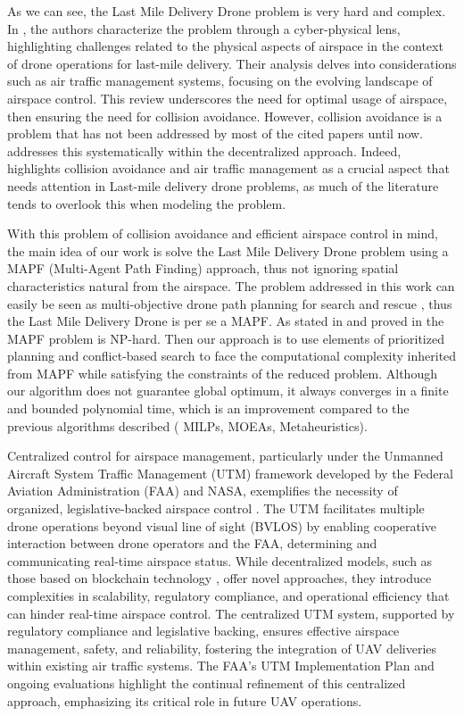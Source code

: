 As we can see, the Last Mile Delivery Drone problem is very hard and complex. In , the authors characterize the problem through a cyber-physical lens, highlighting challenges related to the physical aspects of airspace in the context of drone operations for last-mile delivery. Their analysis delves into considerations such as air traffic management systems, focusing on the evolving landscape of airspace control. This review underscores the need for optimal usage of airspace, then ensuring the need for collision avoidance. However, collision avoidance is a problem that has not been addressed by most of the cited papers until now.  addresses this systematically within the decentralized approach. Indeed,  highlights collision avoidance and air traffic management as a crucial aspect that needs attention in Last-mile delivery drone problems, as much of the literature tends to overlook this when modeling the problem. 


With this problem of collision avoidance and efficient airspace control in mind, the main idea of our work is solve the Last Mile Delivery Drone problem using a MAPF (Multi-Agent Path Finding) approach, thus not ignoring spatial characteristics natural from the airspace. The problem addressed in this work can easily be seen as multi-objective drone path planning for search and rescue \cite{hayat2020multi}, thus the Last Mile Delivery Drone is per se a MAPF.  As stated in  and proved in  the MAPF problem is NP-hard. Then our approach is to use elements of prioritized planning \cite{7138650} and conflict-based search \cite{SHARON201540} to face the computational complexity inherited from MAPF while satisfying the constraints of the reduced problem. Although our algorithm does not guarantee global optimum, it always converges in a finite and bounded polynomial time, which is an improvement compared to the previous algorithms described ( MILPs, MOEAs, Metaheuristics).



Centralized control for airspace management, particularly under the Unmanned Aircraft System Traffic Management (UTM) framework developed by the Federal Aviation Administration (FAA) and NASA, exemplifies the necessity of organized, legislative-backed airspace control \cite{nasa}. The UTM facilitates multiple drone operations beyond visual line of sight (BVLOS) by enabling cooperative interaction between drone operators and the FAA, determining and communicating real-time airspace status. While decentralized models, such as those based on blockchain technology \cite{Verri}, offer novel approaches, they introduce complexities in scalability, regulatory compliance, and operational efficiency that can hinder real-time airspace control. The centralized UTM system, supported by regulatory compliance and legislative backing, ensures effective airspace management, safety, and reliability, fostering the integration of UAV deliveries within existing air traffic systems. The FAA's UTM Implementation Plan \cite{9256745} and ongoing evaluations highlight the continual refinement of this centralized approach, emphasizing its critical role in future UAV operations. 


